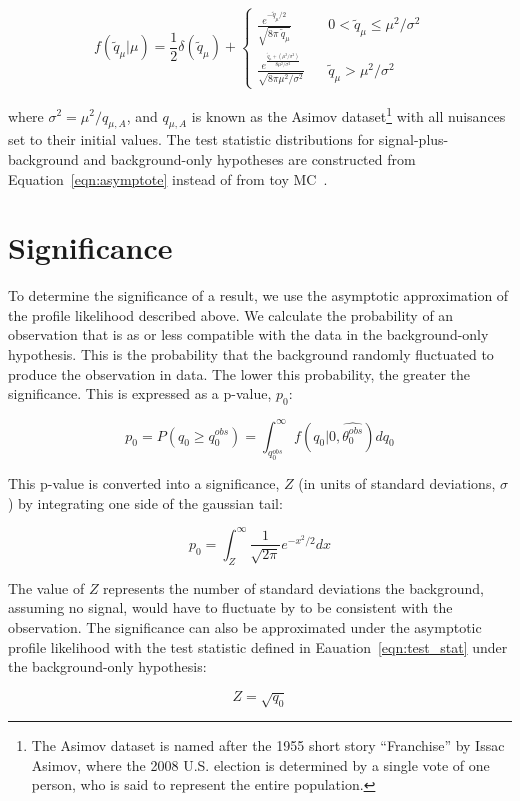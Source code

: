 \begin{equation}
\label{eqn:asymptote}
f(\tilde{q}_{\mu}|\mu) = \frac{1}{2}\delta(\tilde{q}_{\mu}) + \begin{cases}
  \frac{e^{-\tilde{q}_{\mu}/2}}{\sqrt{8\pi~\tilde{q}_{\mu}}} & ~~~~ 0 < \tilde{q}_{\mu} \leq \mu^{2}/\sigma^{2} \\
  \frac{e^{\frac{\tilde{q}_{\mu}+(\mu^{2}/\sigma^{2})}{8\mu^{2}/\sigma^{2}}}}{\sqrt{8\pi\mu^{2}/\sigma^{2}}} & ~~~~ \tilde{q}_{\mu} > \mu^{2}/\sigma^{2}
  \end{cases}
\end{equation}

\noindent where $\sigma^{2} = \mu^{2}/q_{\mu,A}$, and $q_{\mu,A}$ is known as the Asimov dataset\footnote{The Asimov dataset is named after the 1955 short story ``Franchise'' by Issac Asimov, where the 2008
U.S. election is determined by a single vote of one person, who is said to represent the entire population.} with all nuisances set to their initial values. The test statistic distributions for
signal-plus-background and background-only hypotheses are constructed from Equation~\ref{eqn:asymptote} instead of from toy MC~\cite{CMS-AN-11-298}. 

\section{Significance}
To determine the significance of a result, we use the asymptotic approximation of the profile likelihood described above. We calculate the probability of an observation that is as or less compatible with the
data in the background-only hypothesis. This is the probability that the background randomly fluctuated to produce the observation in data. The lower this probability, the greater the significance.
This is expressed as a p-value, $p_{0}$:

\begin{equation}
\label{eqn:signif1}
p_{0} = P(q_{0} \geq q_{0}^{obs}) = \int_{q_{0}^{obs}}^{\infty} f(q_{0}|0,\hat{\theta_{0}^{obs}}) dq_{0}
\end{equation}

\noindent This p-value is converted into a significance, $Z$ (in units of standard deviations, $\sigma$) by integrating one side of the gaussian tail:

\begin{equation}
\label{eqn:signif2}
p_{0} = \int_{Z}^{\infty} \frac{1}{\sqrt{2\pi}}e^{-x^{2}/2} dx
\end{equation}

\noindent The value of $Z$ represents the number of standard deviations the background, assuming no signal, would have to fluctuate by to be consistent with the observation. 
The significance can also be approximated under the asymptotic profile likelihood with the test statistic defined in Eauation~\ref{eqn:test_stat} under the background-only hypothesis:

\begin{equation}
\label{eqn:signif3}
Z = \sqrt{q_{0}}
\end{equation}
